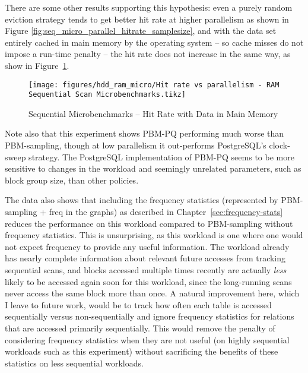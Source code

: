 

There are some other results supporting this hypothesis: even a purely random eviction strategy tends to get better hit rate at higher parallelism as shown in Figure \ref{fig:seq_micro_parallel_hitrate_samplesize}, and with the data set entirely cached in main memory by the operating system -- so cache misses do not impose a run-time penalty -- the hit rate does not increase in the same way, as show in Figure~\ref{fig:ram_hit_rate}.

\begin{figure}[H]%
    \centering
    \texttt{[image: figures/hdd\_ram\_micro/Hit rate vs parallelism - RAM Sequential Scan Microbenchmarks.tikz]}
    \caption{Sequential Microbenchmarks -- Hit Rate with Data in Main Memory}
    \label{fig:ram_hit_rate}
\end{figure}

Note also that this experiment shows PBM-PQ performing much worse than PBM-sampling, though at low parallelism it out-performs PostgreSQL's clock-sweep strategy. The PostgreSQL implementation of PBM-PQ seems to be more sensitive to changes in the workload and seemingly unrelated parameters, such as block group size, than other policies. %

The data also shows that including the frequency statistics (represented by PBM-sampling + freq in the graphs) as described in Chapter~\ref{sec:frequency-stats} reduces the performance on this workload compared to PBM-sampling without frequency statistics. This is unsurprising, as this workload is one where one would not expect frequency to provide any useful information. The workload already has nearly complete information about relevant future accesses from tracking sequential scans, and blocks accessed multiple times recently are actually \textit{less} likely to be accessed again soon for this workload, since the long-running scans never access the same block more than once. A natural improvement here, which I leave to future work, would be to track how often each table is accessed sequentially versus non-sequentially and ignore frequency statistics for relations that are accessed primarily sequentially. This would remove the penalty of considering frequency statistics when they are not useful (on highly sequential workloads such as this experiment) without sacrificing the benefits of these statistics on less sequential workloads.


